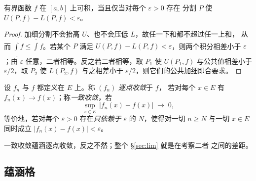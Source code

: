 \begin{lemma}[黎曼准则]\label{lem:riemann}
有界函数 $f$ 在 $[a,b]$ 上可积，当且仅当对每个 $\varepsilon>0$ 存在
分割 $P$ 使 $U(P,f)-L(P,f) < \varepsilon$。
\end{lemma}

\begin{proof}
加细分割不会抬高 $U$、也不会压低 $L$，故任一下和都不超过任一上和，
从而 $\underline{\int} f \le \overline{\int} f$。若某个 $P$ 满足
$U(P,f)-L(P,f)<\varepsilon$，则两个积分相差小于 $\varepsilon$；由
$\varepsilon$ 任意，二者相等。反之若二者相等，取 $P_1$ 使 $U(P_1,f)$
与公共值相差小于 $\varepsilon/2$，取 $P_2$ 使 $L(P_2,f)$ 与之相差小于
$\varepsilon/2$，则它们的公共加细即合要求。
\end{proof}

\begin{definition}[收敛]\label{def:conv}
设 $f_n$ 与 $f$ 都定义在 $E$ 上。称 $(f_n)$ \emph{逐点收敛}于 $f$，
若对每个 $x \in E$ 有 $f_n(x)\to f(x)$；称\emph{一致收敛}，若
\[ \sup_{x\in E}\,|f_n(x)-f(x)| \;\longrightarrow\; 0 , \]
等价地，若对每个 $\varepsilon>0$ 存在\emph{只依赖于 $\varepsilon$}
的 $N$，使得对一切 $n \ge N$ 与一切 $x \in E$ 同时成立
$|f_n(x)-f(x)|<\varepsilon$。
\end{definition}

一致收敛蕴涵逐点收敛，反之不然；整个 \S\ref{sec:lim} 就是在考察二者
之间的差距。

\subsection*{蕴涵格}

